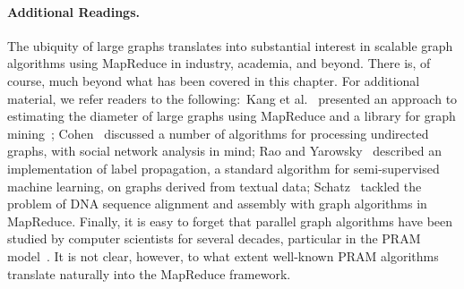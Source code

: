 \paragraph{Additional Readings.} 
The ubiquity of large graphs translates into substantial interest in
scalable graph algorithms using MapReduce in industry, academia, and
beyond.  There is, of course, much beyond what has been covered in
this chapter.  For additional material, we refer readers to the
following:\ Kang et al.~\cite{KangU_etal_2008} presented an approach
to estimating the diameter of large graphs using MapReduce and a
library for graph mining~\cite{KangU_etal_2009};
Cohen~\cite{CohenJonathan_2009} discussed a number of algorithms for
processing undirected graphs, with social network analysis in mind;
Rao and Yarowsky~\cite{Rao_Yarowsky_2009} described an implementation
of label propagation, a standard algorithm for semi-supervised machine
learning, on graphs derived from textual data;
Schatz~\cite{Schatz_2010} tackled the problem of DNA sequence
alignment and assembly with graph algorithms in MapReduce.  Finally,
it is easy to forget that parallel graph algorithms have been studied
by computer scientists for several decades, particular in the PRAM
model~\cite{JaJa_1992,Grama_etal_2003}.  It is not clear, however, to
what extent well-known PRAM algorithms translate naturally into the
MapReduce framework.
